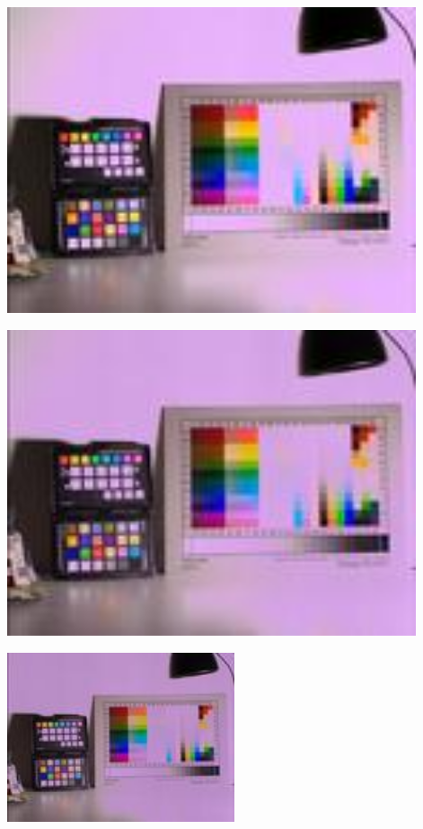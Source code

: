 \begin{center}
\includegraphics[height=9cm]{images/100ms-1ms-8-tiny}
\end{center}

\begin{center}
\includegraphics[height=9cm]{images/100ms-1ms-16-tiny}
\end{center}

\begin{center}
\includegraphics[height=5cm]{images/100ms-1ms-24-tiny}
\end{center}


